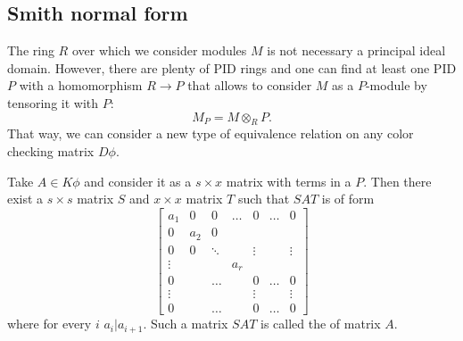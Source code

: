 \subsection{Smith normal form}

%
The ring $R$ over which we consider modules $M$ is not necessary a principal ideal domain. However, there are plenty of PID rings and one can find at least one PID $P$ with a homomorphism $R\to P$ that allows to consider $M$ as a $P$-module by tensoring it with $P$:
$$M_P=M\otimes_R P.$$
That way, we can consider a new type of equivalence relation on any color checking matrix $D\phi$.
\begin{definition}
Take $A\in K\phi$ and consider it as a $s\times x$ matrix with terms in a $P$. Then there exist a $s\times s$ matrix $S$ and $x\times x$ matrix $T$ such that $SAT$ is of form
$$
\begin{bmatrix}
  a_1 & 0 & 0 & \hdots & 0 & \hdots & 0 \\ 
  0 & a_2 & 0\\ 
  0 & 0 & \ddots & & \vdots & & \vdots\\ 
  \vdots & & & a_r\\ 
  0 & & \hdots & & 0 & \hdots & 0 \\ 
  \vdots & & & & \vdots & & \vdots\\ 
  0 & & \hdots & & 0 & \hdots & 0
\end{bmatrix}
$$
where for every $i$ $a_i|a_{i+1}$. Such a matrix $SAT$ is called the  of matrix $A$.
\end{definition}

